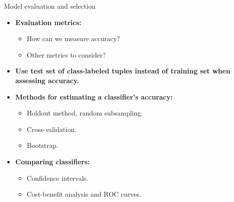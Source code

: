\documentclass[aspectratio=169,t,table]{beamer}
\begin{document}
  {
    \begin{frame}{Model evaluation and selection}
        \begin{itemize}
          \item \textbf{Evaluation metrics:}
          \begin{itemize}
            \item How can we measure accuracy?
            \item Other metrics to consider?
          \end{itemize}
          \item \textbf{Use {\color{airforceblue}test} set of class-labeled tuples instead of training set when assessing accuracy.}
          \item \textbf{Methods for estimating a classifier's accuracy:}
          \begin{itemize}
            \item Holdout method, random subsampling.
            \item Cross-validation.
            \item Bootstrap.
          \end{itemize}
          \item \textbf{Comparing classifiers:}
          \begin{itemize}
            \item Confidence intervals.
            \item Cost-benefit analysis and ROC curves.
          \end{itemize}
        \end{itemize}
    \end{frame}
  }
\end{document}
